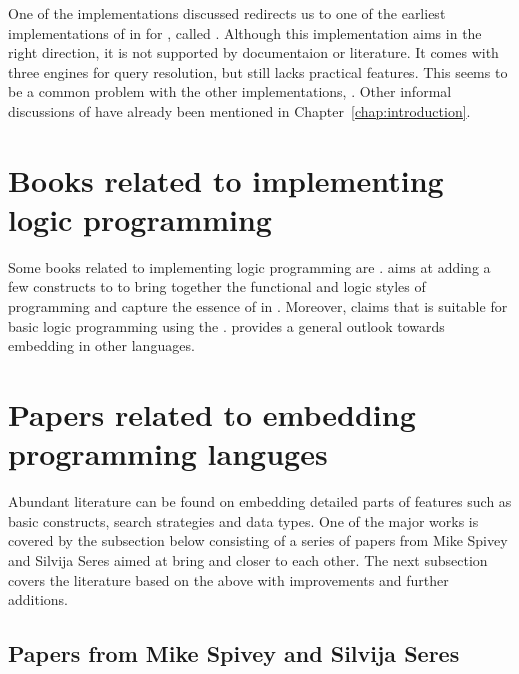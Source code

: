 \documentclass[thesis-solanki.tex]{subfiles}
\begin{document}
One of the implementations discussed redirects us to one of the earliest implementations of  in
 for , called  
\cite{website:mini-prolog-hugs98}.
Although this implementation aims in the right direction, it is not supported by documentaion or literature.
It comes with three engines for query resolution, but still lacks practical  features.
This seems to be a common problem with the other implementations, \cite{website:takashi-workplace}.
Other informal discussions of  have already been mentioned in Chapter~\ref{chap:introduction}.

\section{Books related to implementing logic programming}

Some books related to implementing logic programming are \cite{friedman05reasoned,website:logicprogexamplehaskell,krishnamurthi2007programming}. \cite{friedman05reasoned} aims at adding a few
constructs to  to bring together the functional and logic styles of programming and capture the essence of
 in . Moreover, \cite{website:logicprogexamplehaskell} claims that  is suitable for basic logic
programming using the .
\cite{krishnamurthi2007programming} provides a general outlook towards embedding  in other languages.

\section{Papers related to embedding programming languges}

Abundant literature can be found on embedding detailed parts of  features such as basic
constructs, search strategies and data types.
One of the major works is covered by the subsection below consisting of a series of papers from Mike Spivey and
Silvija Seres aimed at bring  and  closer to each other.
The next subsection covers the literature based on the above
with improvements and further additions.


\subsection{Papers from Mike Spivey and Silvija Seres}
\end{document}
